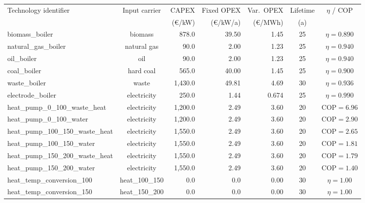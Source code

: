 \begin{table}[h!]
	\centering
	\label{table:SIBoilersHP}
	\begin{threeparttable}
	\begin{tabular}{lcrrrcc}
		\toprule
		Technology identifier & Input carrier & CAPEX & Fixed OPEX & Var.\ OPEX & Lifetime & $\eta$ / COP \\
		& & (\euro/kW) & (\euro/kW/a) & (\euro/MWh) & (a) & \\
		\midrule
		biomass\_boiler & biomass & 878.0 & 39.50 & 1.45 & 25 & $\eta=0.890$ \\
		natural\_gas\_boiler & natural gas & 90.0 & 2.00 & 1.23 & 25 & $\eta=0.940$ \\
		oil\_boiler & oil & 90.0 & 2.00 & 1.23 & 25 & $\eta=0.940$ \\
        coal\_boiler & hard coal & 565.0 & 40.00 & 1.45 & 25 & $\eta=0.900$ \\
        waste\_boiler & waste & 1{,}430.0 & 49.81 & 4.69 & 30 & $\eta=0.936$ \\
		electrode\_boiler & electricity & 250.0 & 1.44 & 0.674 & 25 & $\eta=0.990$ \\
		\midrule
		heat\_pump\_0\_100\_waste\_heat & electricity & 1{,}200.0 & 2.49 & 3.60 & 20 & COP$=6.96$ \\
		heat\_pump\_0\_100\_water & electricity & 1{,}200.0 & 2.49 & 3.60 & 20 & COP$=2.90$ \\
		heat\_pump\_100\_150\_waste\_heat & electricity & 1{,}550.0 & 2.49 & 3.60 & 20 & COP$=2.65$ \\
		heat\_pump\_100\_150\_water & electricity & 1{,}550.0 & 2.49 & 3.60 & 20 & COP$=1.81$ \\
		heat\_pump\_150\_200\_waste\_heat & electricity & 1{,}550.0 & 2.49 & 3.60 & 20 & COP$=1.79$ \\
		heat\_pump\_150\_200\_water & electricity & 1{,}550.0 & 2.49 & 3.60 & 20 & COP$=1.40$ \\
		\midrule
		heat\_temp\_conversion\_100\tnote{a} & heat\_100\_150 & 0.0 & 0.0 & 0.00 & 30 & $\eta=1.00$ \\
		heat\_temp\_conversion\_150\tnote{a} & heat\_150\_200 & 0.0 & 0.0 & 0.00 & 30 & $\eta=1.00$ \\

\end{tabular}
\end{threeparttable}
\end{table}
